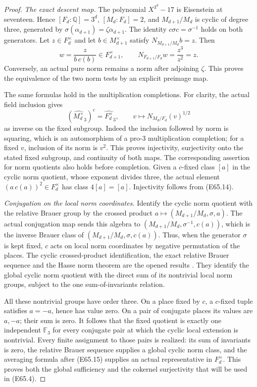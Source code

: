 \begin{proof}
\emph{The exact descent map.}
The polynomial $X^{3^d}-17$ is Eisenstein at seventeen. Hence
$[F_d:\mathbb Q]=3^d$, $[M_d:F_d]=2$, and
$M_{d+1}/M_d$ is cyclic of degree three, generated by
$\sigma(\alpha_{d+1})=\zeta\alpha_{d+1}$.
The identity $c\sigma c=\sigma^{-1}$ holds on both generators.
Let $z\in F_d^\times$ and let $b\in M_{d+1}^\times$ satisfy
$N_{M_{d+1}/M_d}b=z$.
Then
\[
 w=\frac{z}{b\,c(b)}\in F_{d+1}^\times,
 \qquad N_{F_{d+1}/F_d}w=\frac{z^3}{z^2}=z.
 \tag{E65.14}
\]
Conversely, an actual pure norm remains a norm after adjoining
$\zeta$. This proves the equivalence of the two norm tests by an
explicit preimage map.

The same formulas hold in the multiplication completions.
For clarity, the actual field inclusion gives
\[
 (\widehat{M_d^\times}_3)^c=
        \widehat{F_d^\times}_3,
 \qquad
 v\longmapsto N_{M_d/F_d}(v)^{1/2}
 \tag{E65.15}
\]
as inverse on the fixed subgroup.
Indeed the inclusion followed by norm is squaring, which is an
automorphism of a pro-$3$ multiplication completion; for a fixed
$v$, inclusion of its norm is $v^2$.
This proves injectivity, surjectivity onto the stated fixed subgroup,
and continuity of both maps. The corresponding assertion for norm
quotients also holds before completion. Given a $c$-fixed class
$[a]$ in the cyclic norm quotient, whose exponent divides three,
the actual element $(a\,c(a))^2\in F_d^\times$ has class
$4[a]=[a]$. Injectivity follows from (E65.14).

\emph{Conjugation on the local norm coordinates.}
Identify the cyclic norm quotient with the relative Brauer group by
the crossed product $a\mapsto(M_{d+1}/M_d,\sigma,a)$.
The actual conjugation map sends this algebra to
$(M_{d+1}/M_d,\sigma^{-1},c(a))$, which is the inverse Brauer class
of $(M_{d+1}/M_d,\sigma,c(a))$.
Thus, when the generator $\sigma$ is kept fixed, $c$ acts on local
norm coordinates by negative permutation of the places.
The cyclic crossed-product identification, the exact relative
Brauer sequence and the Hasse norm theorem are the opened results
\cite[IV, Theorem3.14; VIII, \S4, the exact sequence preceding
Lemma4.1 and its proof; VIII, Theorem3.1]{E_MilneCFT}.
They identify the global cyclic norm quotient with the direct sum
of its nontrivial local norm groups, subject to the one sum-of-invariants
relation.

All these nontrivial groups have order three. On a place fixed by
$c$, a $c$-fixed tuple satisfies $a=-a$, hence has value zero.
On a pair of conjugate places its values are $a,-a$; their sum is
zero. It follows that the fixed quotient is exactly one independent
$\mathbb F_3$ for every conjugate pair at which the cyclic local
extension is nontrivial. Every finite assignment to those pairs is
realized: its sum of invariants is zero, the relative Brauer sequence
supplies a global cyclic norm class, and the averaging formula after
(E65.15) supplies an actual representative in $F_d^\times$.
This proves both the global sufficiency and the cokernel surjectivity
that will be used in (E65.4).


\end{proof}
